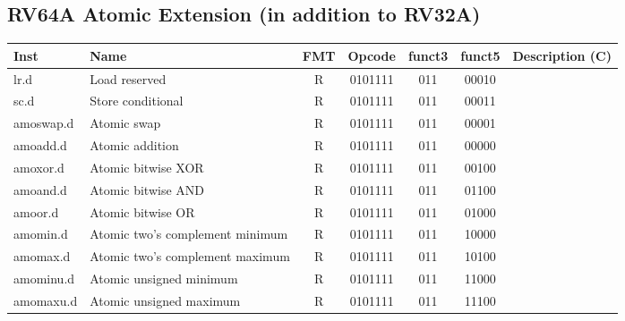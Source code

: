\subsection*{RV64A Atomic Extension (in addition to RV32A)}
\begin{center}
    
\begin{tabular}
{T | l | c | c | c | c | T} \hline
\rm Inst & Name                    & FMT & \rm Opcode & \rm funct3 & \rm funct5 & \rm Description (C)          \\ \hline
lr.d     & Load reserved   & R   & 0101111    & 011    & 00010   &                \\
sc.d     & Store conditional   & R   & 0101111    & 011    & 00011   &             \\
amoswap.d& Atomic swap   & R   & 0101111    & 011    & 00001   &                \\
amoadd.d & Atomic addition   & R   & 0101111    & 011    & 00000   &               \\
amoxor.d & Atomic bitwise XOR   & R   & 0101111    & 011    & 00100   &        \\
amoand.d & Atomic bitwise AND   & R   & 0101111    & 011    & 01100   &        \\
amoor.d  & Atomic bitwise OR   & R   & 0101111    & 011    & 01000   &        \\
amomin.d & Atomic two’s complement minimum   & R   & 0101111    & 011    & 10000   &        \\
amomax.d & Atomic two’s complement maximum   & R   & 0101111    & 011    & 10100   &        \\
amominu.d& Atomic unsigned minimum   & R   & 0101111    & 011    & 11000   &        \\
amomaxu.d& Atomic unsigned maximum   & R   & 0101111    & 011    & 11100   &        \\

\end{tabular}
\end{center}


